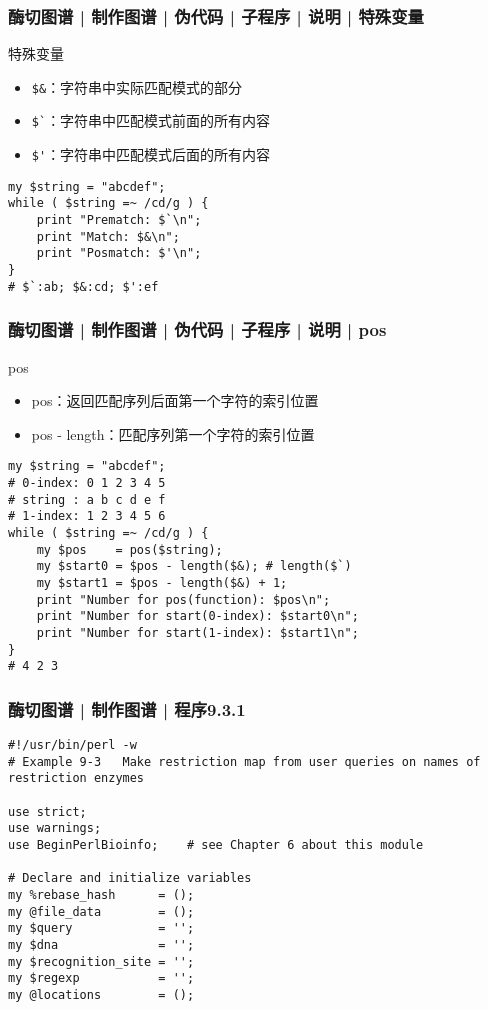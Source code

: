 \begin{frame}[fragile]
  \frametitle{酶切图谱 | 制作图谱 | 伪代码 | 子程序 | 说明 | \alert{特殊变量}}
  \begin{block}{特殊变量}
    \begin{itemize}
      \item \verb|$&|：字符串中实际匹配模式的部分
      \item \verb|$`|：字符串中匹配模式前面的所有内容
      \item \verb|$'|：字符串中匹配模式后面的所有内容
    \end{itemize}
  \end{block}
  \pause
\begin{lstlisting}
my $string = "abcdef";
while ( $string =~ /cd/g ) {
    print "Prematch: $`\n";
    print "Match: $&\n";
    print "Posmatch: $'\n";
}
# $`:ab; $&:cd; $':ef
\end{lstlisting}
\end{frame}

\begin{frame}[fragile]
  \frametitle{酶切图谱 | 制作图谱 | 伪代码 | 子程序 | 说明 | \alert{pos}}
  \begin{block}{pos}
    \begin{itemize}
      \item pos：返回匹配序列后面第一个字符的索引位置
      \item pos - length：匹配序列第一个字符的索引位置
    \end{itemize}
  \end{block}
  \pause
  \vspace{-0.5em}
\begin{lstlisting}[basicstyle=\small\tt,numberstyle=\footnotesize]
my $string = "abcdef";
# 0-index: 0 1 2 3 4 5
# string : a b c d e f
# 1-index: 1 2 3 4 5 6
while ( $string =~ /cd/g ) {
    my $pos    = pos($string);
    my $start0 = $pos - length($&); # length($`)
    my $start1 = $pos - length($&) + 1;
    print "Number for pos(function): $pos\n";
    print "Number for start(0-index): $start0\n";
    print "Number for start(1-index): $start1\n";
}
# 4 2 3
\end{lstlisting}
\end{frame}

\begin{frame}[fragile]
  \frametitle{酶切图谱 | 制作图谱 | 程序9.3.1}
\begin{lstlisting}[firstnumber=1,basicstyle=\small\tt,numberstyle=\footnotesize]
#!/usr/bin/perl -w
# Example 9-3   Make restriction map from user queries on names of restriction enzymes

use strict;
use warnings;
use BeginPerlBioinfo;    # see Chapter 6 about this module

# Declare and initialize variables
my %rebase_hash      = ();
my @file_data        = ();
my $query            = '';
my $dna              = '';
my $recognition_site = '';
my $regexp           = '';
my @locations        = ();
\end{lstlisting}
\end{frame}

